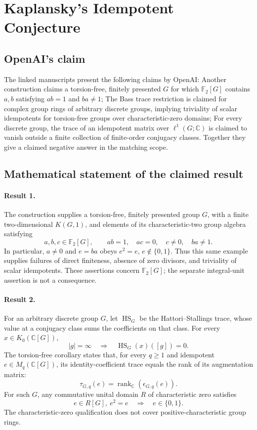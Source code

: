 \documentclass[11pt]{article}
\begin{document}
\section*{Kaplansky's Idempotent Conjecture}

\subsection{OpenAI's claim}
The linked manuscripts present the following claims by OpenAI: Another construction claims a torsion-free, finitely presented $G$ for which $\mathbb F_2[G]$ contains $a,b$ satisfying $ab=1$ and $ba\ne1$; The Bass trace restriction is claimed for complex group rings of arbitrary discrete groups, implying triviality of scalar idempotents for torsion-free groups over characteristic-zero domains; For every discrete group, the trace of an idempotent matrix over $\ell^1(G;\mathbb C)$ is claimed to vanish outside a finite collection of finite-order conjugacy classes. Together they give a claimed negative answer in the matching scope.

\subsection{Mathematical statement of the claimed result}
\paragraph{Result 1.} The construction supplies a torsion-free, finitely presented group \(G\), with a finite two-dimensional \(K(G,1)\), and elements of its characteristic-two group algebra satisfying
\[
 a,b,c\in\mathbb F_2[G],\qquad ab=1,\quad ac=0,\quad c\ne0,\quad ba\ne1.
\]
In particular, \(a\ne0\) and \(e=ba\) obeys \(e^2=e\), \(e\notin\{0,1\}\). Thus this same example supplies failures of direct finiteness, absence of zero divisors, and triviality of scalar idempotents. These assertions concern \(\mathbb F_2[G]\); the separate integral-unit assertion is not a consequence.

\paragraph{Result 2.} For an arbitrary discrete group \(G\), let \(\operatorname{HS}_G\) be the Hattori--Stallings trace, whose value at a conjugacy class sums the coefficients on that class. For every \(x\in K_0(\mathbb C[G])\),
\[
 |g|=\infty\quad\Longrightarrow\quad\operatorname{HS}_G(x)([g])=0.
\]
The torsion-free corollary states that, for every \(q\ge1\) and idempotent \(e\in M_q(\mathbb C[G])\), its identity-coefficient trace equals the rank of its augmentation matrix:
\[
 \tau_{G,q}(e)=\operatorname{rank}_{\mathbb C}(\epsilon_{G,q}(e)).
\]
For such \(G\), any commutative unital domain \(R\) of characteristic zero satisfies
\[
 e\in R[G],\ e^2=e\quad\Longrightarrow\quad e\in\{0,1\}.
\]
The characteristic-zero qualification does not cover positive-characteristic group rings.
\end{document}
